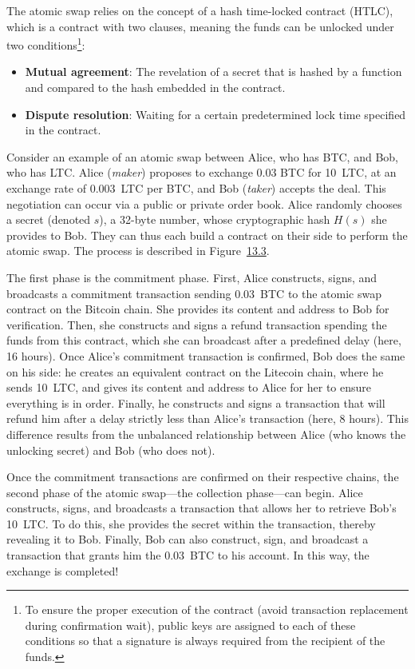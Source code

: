 \documentclass[
  a5paper,
  smalldemyvopaper,10pt,twoside,onecolumn,openright,extrafontsizes,hidelinks]{memoir}
\begin{document}
The atomic swap relies on the concept of a hash time-locked contract
(HTLC), which is a contract with two clauses, meaning the funds can be
unlocked under two conditions\footnote{To ensure the proper execution of
  the contract (avoid transaction replacement during confirmation wait),
  public keys are assigned to each of these conditions so that a
  signature is always required from the recipient of the funds.}:

\begin{itemize}
\item
  \textbf{Mutual agreement}: The revelation of a secret that is hashed
  by a function and compared to the hash embedded in the contract.
\item
  \textbf{Dispute resolution}: Waiting for a certain predetermined lock
  time specified in the contract.
\end{itemize}

Consider an example of an atomic swap between Alice, who has BTC, and
Bob, who has LTC. Alice (\emph{maker}) proposes to exchange 0.03 BTC for
10~LTC, at an exchange rate of 0.003~LTC per BTC, and Bob (\emph{taker})
accepts the deal. This negotiation can occur via a public or private
order book. Alice randomly chooses a secret (denoted \(s\)), a 32-byte
number, whose cryptographic hash \(H(s)\) she provides to Bob. They can
thus each build a contract on their side to perform the atomic swap. The
process is described in
Figure~\hyperref[fig:atomic-swap-contract]{13.3}.

The first phase is the commitment phase. First, Alice constructs, signs,
and broadcasts a commitment transaction sending 0.03~BTC to the atomic
swap contract on the Bitcoin chain. She provides its content and address
to Bob for verification. Then, she constructs and signs a refund
transaction spending the funds from this contract, which she can
broadcast after a predefined delay (here, 16 hours). Once Alice's
commitment transaction is confirmed, Bob does the same on his side: he
creates an equivalent contract on the Litecoin chain, where he sends
10~LTC, and gives its content and address to Alice for her to ensure
everything is in order. Finally, he constructs and signs a transaction
that will refund him after a delay strictly less than Alice's
transaction (here, 8 hours). This difference results from the unbalanced
relationship between Alice (who knows the unlocking secret) and Bob (who
does not).

Once the commitment transactions are confirmed on their respective
chains, the second phase of the atomic swap---the collection phase---can
begin. Alice constructs, signs, and broadcasts a transaction that allows
her to retrieve Bob's 10~LTC. To do this, she provides the secret within
the transaction, thereby revealing it to Bob. Finally, Bob can also
construct, sign, and broadcast a transaction that grants him the
0.03~BTC to his account. In this way, the exchange is completed!
\end{document}
